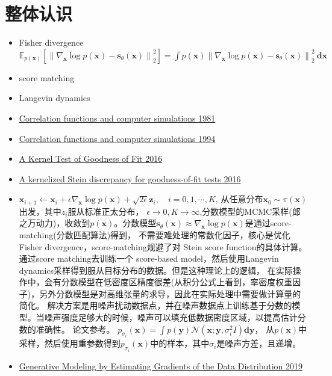 \documentclass[lang=cn,newtx,10pt,scheme=chinese]{elegantbook}
\begin{document}
\section{整体认识}
\begin{itemize}
  \item  Fisher divergence $\mathbb{E}_{p(\mathbf{x})}\left[\left\|\nabla_{\mathbf{x}} \log p(\mathbf{x})-\mathbf{s}_\theta(\mathbf{x})\right\|_2^2\right]=\int p(\mathbf{x})\left\|\nabla_{\mathbf{x}} \log p(\mathbf{x})-\mathbf{s}_\theta(\mathbf{x})\right\|_2^2 \mathbf{~d} \mathbf{x}$
  \item score matching
  \item  Langevin dynamics
  \item \href{c}{Correlation functions and computer simulations 1981}
  \item \href{c}{Correlation functions and computer simulations 1994}
  \item \href{c}{A Kernel Test of Goodness of Fit 2016}
  \item \href{c}{A kernelized Stein discrepancy for goodness-of-fit tests 2016}
  \item $\mathbf{x}_{i+1} \leftarrow \mathbf{x}_i+\epsilon \nabla_{\mathbf{x}} \log p(\mathbf{x})+\sqrt{2 \epsilon} \mathbf{z}_i, \quad i=0,1, \cdots, K$, 从任意分布$\mathbf{x}_0 \sim \pi(\mathbf{x})$出发，其中$z_i$服从标准正太分布，
  $\epsilon \rightarrow 0, K \rightarrow \infty$,分数模型的MCMC采样(郎之万动力)，收敛到$p(\mathbf{x})$。分数模型$\mathbf{s}_\theta(\mathbf{x}) \approx \nabla_{\mathbf{x}} \log p(\mathbf{x})$是通过score-matching(分数匹配算法)得到，
  不需要难处理的常数化因子，核心是优化Fisher divergence，score-matching规避了对 Stein score function的具体计算。
  通过score matching去训练一个 score-based model，然后使用Langevin dynamics采样得到服从目标分布的数据。但是这种理论上的逻辑，
  在实际操作中，会有分数模型在低密度区精度很差(从积分公式上看到，率密度权重因子)，另外分数模型是对高维张量的求导，因此在实际处理中需要做计算量的简化。
  解决方案是用噪声扰动数据点，并在噪声数据点上训练基于分数的模型。当噪声强度足够大的时候，噪声可以填充低数据密度区域，以提高估计分数的准确性。
  论文参考。
  $p_{\sigma_i}(\mathbf{x})=\int p(\mathbf{y}) \mathcal{N}\left(\mathbf{x} ; \mathbf{y}, \sigma_i^2 I\right) \mathbf{d} \mathbf{y}$，
  从$p(\mathbf{x})$中采样，然后使用重参数得到$p_{\sigma_i}(\mathbf{x})$中的样本，其中$\sigma_i$是噪声方差，且递增。
  \item \href{c}{Generative Modeling by Estimating Gradients of the Data Distribution 2019}

\end{itemize}
\end{document}
